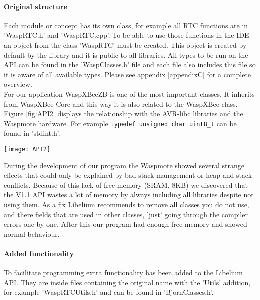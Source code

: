 \paragraph{Original structure}
Each module or concept has its own class, for example all RTC functions are in 'WaspRTC.h' and 'WaspRTC.cpp'. To be able to use those functions in the IDE an object from the class 'WaspRTC' must be created. This object is created by default by the library and it is public to all libraries. All types to be run on the API can be found in the 'WaspClasses.h' file and each file also includes this file so it is aware of all available types. Please see appendix \ref{appendixC} for a complete overview.\\
For our application WaspXBeeZB is one of the most important classes. It inherits from WaspXBee Core and this way it is also related to the WaspXBee class. Figure \ref{fig:API2} displays the relationship with the AVR-libc libraries and the Waspmote hardware. For example \verb+typedef unsigned char uint8_t+ can be found in 'stdint.h'.\\ 
\begin{figure*}[ht]
\centering
\texttt{[image: API2]}
\caption{Reduced dependency of Waspmote core libraries}
\label{fig:API2}
\end{figure*}
\noindent During the development of our program the Waspmote showed several strange effects that could only be explained by bad stack management or heap and stack conflicts. Because of this lack of free memory (SRAM, 8KB) we discovered that the V1.1 API wastes a lot of memory by always including all libraries despite not using them. As a fix Libelium recommends to remove all classes you do not use, and there fields that are used in other classes, 'just' going through the compiler errors one by one. After this our program had enough free memory and showed normal behaviour.
\paragraph{Added functionality}
To facilitate programming extra functionality has been added to the Libelium API. They are inside files containing the original name with the 'Utils' addition, for example 'WaspRTCUtils.h' and can be found in 'BjornClasses.h'.




